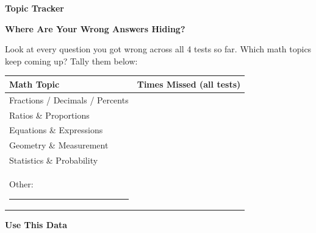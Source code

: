 \clearpage
\thispagestyle{empty}
{\sffamily

\begin{center}
{\fontsize{22}{26}\selectfont\bfseries\color{funPurple} \faMapMarkedAlt\hspace{3mm}Topic Tracker\hspace{3mm}\faMapMarkedAlt}

\vspace{2mm}
{\color{funGray}\hrulefill}
\end{center}

\vspace{3mm}

\begin{tcolorbox}[
    enhanced,
    colback=funPurpleLight,
    colframe=funPurple!50,
    arc=10pt,
    boxrule=1.5pt,
    left=6mm, right=6mm, top=5mm, bottom=5mm,
]
{\large\bfseries\color{funPurpleDark} \faSearchPlus\hspace{2mm}Where Are Your Wrong Answers Hiding?}

\vspace{2mm}

Look at every question you got wrong across all 4 tests so far. Which math topics keep coming up? Tally them below:

\vspace{3mm}

\begin{center}
\renewcommand{\arraystretch}{1.4}
\begin{tabular}{|p{5cm}|>{\centering\arraybackslash}p{4.5cm}|}
\hline
\rowcolor{funPurple!15} \textbf{Math Topic} & \textbf{Times Missed (all tests)} \\
\hline
Fractions / Decimals / Percents & \\[2mm]
\hline
Ratios \& Proportions & \\[2mm]
\hline
Equations \& Expressions & \\[2mm]
\hline
Geometry \& Measurement & \\[2mm]
\hline
Statistics \& Probability & \\[2mm]
\hline
Other: \rule[-2pt]{2.5cm}{0.5pt} & \\[2mm]
\hline
\end{tabular}
\end{center}
\end{tcolorbox}

\vspace{3mm}

\begin{tcolorbox}[
    enhanced,
    colback=funYellowLight,
    colframe=funYellow!60,
    arc=10pt,
    boxrule=1pt,
    left=6mm, right=6mm, top=4mm, bottom=4mm,
]
{\bfseries\color{funYellowDark} \faLightbulb\hspace{2mm}Use This Data}


\end{tcolorbox}}
